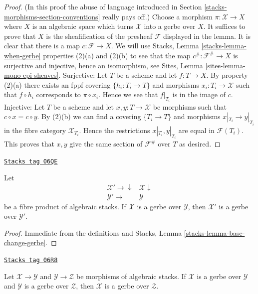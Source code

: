 \begin{proof}
(In this proof the abuse of language introduced in
Section \ref{stacks-morphisms-section-conventions}
really pays off.)
Choose a morphism $\pi : \mathcal{X} \to X$ where $X$ is an
algebraic space which turns $\mathcal{X}$ into a gerbe over $X$.
It suffices to prove that $X$ is the sheafification of the presheaf
$\mathcal{F}$ displayed in the lemma.
It is clear that there is a map $c : \mathcal{F} \to X$.
We will use
Stacks, Lemma \ref{stacks-lemma-when-gerbe}
properties (2)(a) and (2)(b) to see that the map $c^\# : \mathcal{F}^\# \to X$
is surjective and injective, hence an isomorphism, see
Sites, Lemma \ref{sites-lemma-mono-epi-sheaves}.
Surjective: Let $T$ be a scheme and let $f : T \to X$. By property (2)(a)
there exists an fppf covering $\{h_i : T_i \to T\}$ and morphisms
$x_i : T_i \to \mathcal{X}$ such that $f \circ h_i$ corresponds to
$\pi \circ x_i$. Hence we see that $f|_{T_i}$ is in the image of $c$.
Injective: Let $T$ be a scheme and let $x, y : T \to \mathcal{X}$
be morphisms such that $c \circ x = c \circ y$.
By (2)(b) we can find a covering $\{T_i \to T\}$ and morphisms
$x|_{T_i} \to y|_{T_i}$ in the fibre category $\mathcal{X}_{T_i}$.
Hence the restrictions $x|_{T_i}, y|_{T_i}$ are equal in
$\mathcal{F}(T_i)$. This proves that $x, y$ give the same section
of $\mathcal{F}^\#$ over $T$ as desired.
\end{proof}

\begin{lemma}
\label{stacks-morphisms-lemma-base-change-gerbe}
\href{https://stacks.math.columbia.edu/tag/06QE}{\texttt{Stacks tag 06QE}}

Let
$$
\begin{array}{cc}\mathcal{X}' \longrightarrow\downarrow & \mathcal{X} \downarrow \\ \mathcal{Y}' \longrightarrow & \mathcal{Y}\end{array}
$$
be a fibre product of algebraic stacks.
If $\mathcal{X}$ is a gerbe over $\mathcal{Y}$, then
$\mathcal{X}'$ is a gerbe over $\mathcal{Y}'$.
\end{lemma}

\begin{proof}
Immediate from the definitions and
Stacks, Lemma \ref{stacks-lemma-base-change-gerbe}.
\end{proof}

\begin{lemma}
\label{stacks-morphisms-lemma-composition-gerbe}
\href{https://stacks.math.columbia.edu/tag/06R8}{\texttt{Stacks tag 06R8}}

Let $\mathcal{X} \to \mathcal{Y}$ and $\mathcal{Y} \to \mathcal{Z}$
be morphisms of algebraic stacks. If $\mathcal{X}$ is a gerbe over
$\mathcal{Y}$ and $\mathcal{Y}$ is a gerbe over $\mathcal{Z}$, then
$\mathcal{X}$ is a gerbe over $\mathcal{Z}$.
\end{lemma}

